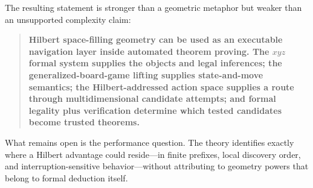\documentclass[11pt]{article}
\theoremstyle{definition}
\begin{document}
The resulting statement is stronger than a geometric metaphor but weaker than an unsupported complexity claim:

\begin{quote}
\textbf{Hilbert space-filling geometry can be used as an executable navigation layer inside automated theorem proving. The $xyz$ formal system supplies the objects and legal inferences; the generalized-board-game lifting supplies state-and-move semantics; the Hilbert-addressed action space supplies a route through multidimensional candidate attempts; and formal legality plus verification determine which tested candidates become trusted theorems.}
\end{quote}

What remains open is the performance question. The theory identifies exactly where a Hilbert advantage could reside---in finite prefixes, local discovery order, and interruption-sensitive behavior---without attributing to geometry powers that belong to formal deduction itself.
\end{document}
